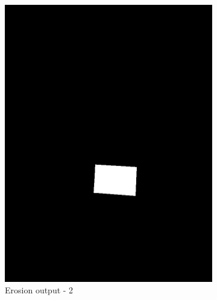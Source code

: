 \documentclass[paper=a4, fontsize=10pt]{scrartcl} %
\numberwithin{equation}{section} %
\numberwithin{figure}{section} %
\begin{document}
\begin{figure}[!ht]
\begin{subfigure}[b]{0.275\textwidth}
		\includegraphics[width=\textwidth]{erosion_02}
		\caption{Erosion output - 2}
		\label{fig:erosion_02}
	\end{subfigure}
	~ 
	\begin{subfigure}[b]{0.275\textwidth}

\end{subfigure}
\end{figure}
\end{document}
